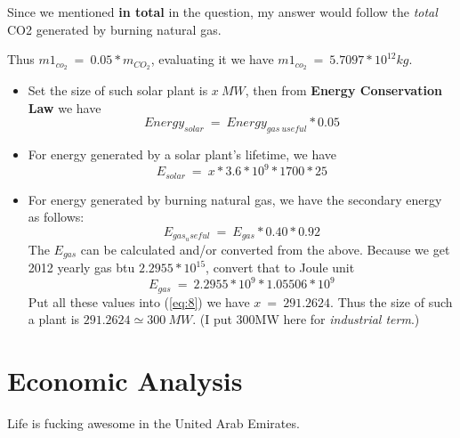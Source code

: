 \documentclass[12pt]{article}
\begin{document}
Since we mentioned \textbf{in total} in the question, my answer would
follow the \emph{total} CO2 generated by burning natural gas.
\par
Thus $m1_{co_{2}}~=~0.05 * m_{CO_{2}}$, evaluating it we have
$m1_{co_{2}}~=~5.7097 * 10^{12} kg$.
\begin{itemize}
\item Set the size of such solar plant is $x~MW$, then from
  \textbf{Energy Conservation Law} we have
  \begin{equation}
    \label{eq:8}
    Energy_{solar}~=~Energy_{gas~useful} * 0.05
  \end{equation}
\item For energy generated by a solar plant's lifetime, we have 
  \begin{equation}
    \label{eq:9}
    E_{solar}~=~x * 3.6 * 10^{9} * 1700 * 25
  \end{equation}
\item For energy generated by burning natural gas, we have the
  secondary energy as follows:
  \begin{equation}
    \label{eq:10}
    E_{gas_useful}~=~E_{gas} * 0.40 * 0.92
  \end{equation}
  The $E_{gas}$ can be calculated and/or converted from the
  above. Because we get 2012 yearly gas btu $2.2955 * 10^{15}$,
  convert that to Joule unit
  \begin{equation}
    \label{eq:11}
    E_{gas}~=~2.2955 * 10^{9} * 1.05506 * 10^{9}
  \end{equation}
  Put all these values into (\ref{eq:8}) we have $x~=~291.2624$. Thus
  the size of such a plant is $291.2624\simeq 300~MW$. (I put 300MW
  here for \emph{industrial term}.)
\end{itemize}


\section{Economic Analysis}
\label{sec:economic-analysis}

Life is fucking awesome in the United Arab Emirates.
\end{document}
